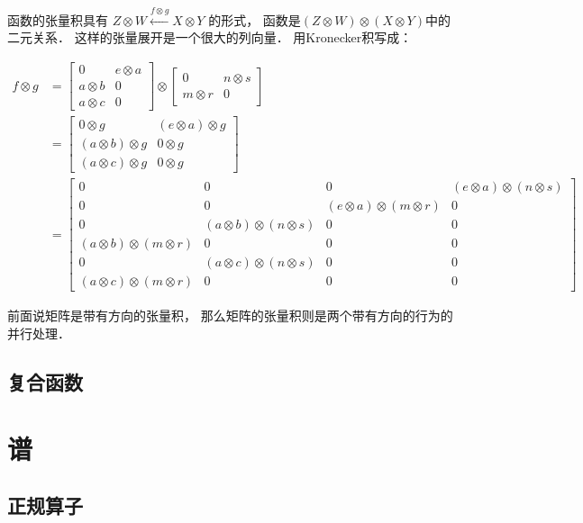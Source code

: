 \documentclass[10pt, openany]{book}
\begin{document}
函数的张量积具有
$Z \otimes W \stackrel{f \otimes g}{\longleftarrow} X \otimes Y$
的形式，
函数是$(Z \otimes W) \otimes (X \otimes Y)$中的二元关系．
这样的张量展开是一个很大的列向量．
用Kronecker积写成：

\[
\begin{aligned}
f \otimes g
&= \begin{bmatrix}
0 & e \otimes a \\ 
a \otimes b & 0 \\ 
a \otimes c & 0
\end{bmatrix}
\otimes 
\begin{bmatrix}
0 & n \otimes s \\ 
m \otimes r & 0
\end{bmatrix} \\
&= \begin{bmatrix}
0 \otimes g & (e \otimes a) \otimes g \\ 
(a \otimes b) \otimes g & 0 \otimes g \\ 
(a \otimes c) \otimes g & 0 \otimes g
\end{bmatrix} \\ 
&= \left[
\begin{array}{cc|cc}
0 & 0 & 0 & (e \otimes a) \otimes (n \otimes s) \\
0 & 0 & (e \otimes a) \otimes (m \otimes r) & 0 \\
\hline
0 & (a \otimes b) \otimes (n \otimes s) & 0 & 0 \\
(a \otimes b) \otimes (m \otimes r) & 0 & 0 & 0 \\
\hline
0 & (a \otimes c) \otimes (n \otimes s) & 0 & 0 \\
(a \otimes c) \otimes (m \otimes r) & 0 & 0 & 0
\end{array}
\right]
\end{aligned}
\]

前面说矩阵是带有方向的张量积，
那么矩阵的张量积则是两个带有方向的行为的并行处理．

\section{复合函数}


\chapter{谱}

\section{正规算子}
\end{document}
